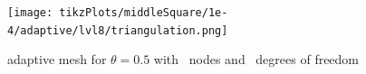 \documentclass[draft=false,twoside,12pt]{scrreprt}
\begin{document}

\begin{figure}[H]
	\centering
  \texttt{[image: tikzPlots/middleSquare/1e-4/adaptive/lvl8/triangulation.png]}
  \caption{adaptive mesh for $\theta = 0.5$ with \nrNodes\ nodes and 
  \nrDof\ degrees of freedom}
\end{figure}

\end{document}
